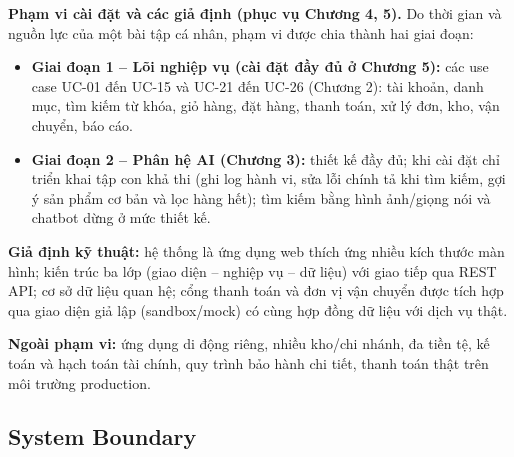 \documentclass[12pt,a4paper,oneside]{report}
\newif\ifmark \marktrue
\newenvironment{chgblock}{\ifmark\color{red}\fi}{}
\begin{document}
\begin{chgblock}
\textbf{Phạm vi cài đặt và các giả định (phục vụ Chương 4, 5).} Do thời gian và nguồn lực của một bài tập cá nhân, phạm vi được chia thành hai giai đoạn:

\begin{itemize}
  \item \textbf{Giai đoạn 1 -- Lõi nghiệp vụ (cài đặt đầy đủ ở Chương 5):} các use case UC-01 đến UC-15 và UC-21 đến UC-26 (Chương 2): tài khoản, danh mục, tìm kiếm từ khóa, giỏ hàng, đặt hàng, thanh toán, xử lý đơn, kho, vận chuyển, báo cáo.
  \item \textbf{Giai đoạn 2 -- Phân hệ AI (Chương 3):} thiết kế đầy đủ; khi cài đặt chỉ triển khai tập con khả thi (ghi log hành vi, sửa lỗi chính tả khi tìm kiếm, gợi ý sản phẩm cơ bản và lọc hàng hết); tìm kiếm bằng hình ảnh/giọng nói và chatbot dừng ở mức thiết kế.
\end{itemize}

\textbf{Giả định kỹ thuật:} hệ thống là ứng dụng web thích ứng nhiều kích thước màn hình; kiến trúc ba lớp (giao diện -- nghiệp vụ -- dữ liệu) với giao tiếp qua REST API; cơ sở dữ liệu quan hệ; cổng thanh toán và đơn vị vận chuyển được tích hợp qua giao diện giả lập (sandbox/mock) có cùng hợp đồng dữ liệu với dịch vụ thật.

\textbf{Ngoài phạm vi:} ứng dụng di động riêng, nhiều kho/chi nhánh, đa tiền tệ, kế toán và hạch toán tài chính, quy trình bảo hành chi tiết, thanh toán thật trên môi trường production.
\end{chgblock}

\subsection{System Boundary}
\end{document}
